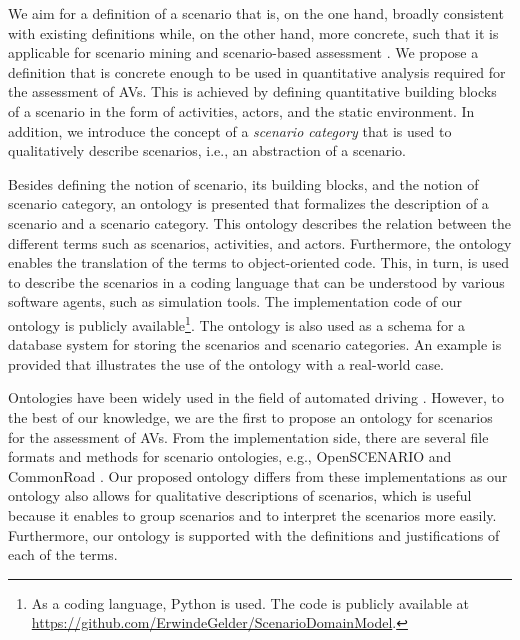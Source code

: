 We aim for a definition of a scenario that is, on the one hand, broadly consistent with existing definitions \autocite{geyer2014, ulbrich2015, elrofai2016scenario} while, on the other hand, more concrete, such that it is applicable for scenario mining \autocite{elrofai2016scenario} and scenario-based assessment \autocite{stellet2015taxonomy, deGelder2017assessment}. We propose a definition that is concrete enough to be used in quantitative analysis required for the assessment of AVs. This is achieved by defining quantitative building blocks of a scenario in the form of activities, actors, and the static environment. In addition, we introduce the concept of a \emph{scenario category}  
that is used to qualitatively describe scenarios, i.e., an abstraction of a scenario. 


Besides defining the notion of scenario, its building blocks, and the notion of scenario category, an ontology is presented that formalizes the description of a scenario and a scenario category. 
This ontology describes the relation between the different terms such as scenarios, activities, and actors.
Furthermore, the ontology enables the translation of the terms to object-oriented code.
This, in turn, is used to describe the scenarios in a coding language that can be understood by various software agents, such as simulation tools. \cstart The implementation code of our ontology is publicly available\footnote{\cstart As a coding language, Python is used. The code is publicly available at \url{https://github.com/ErwindeGelder/ScenarioDomainModel}.\cend}. \cend
The ontology is also used as a schema for a database system for storing the scenarios and scenario categories.
An example is provided that illustrates the use of the ontology with a real-world case.

\cstart Ontologies have been widely used in the field of automated driving \autocite{provine2004ontology, morignot2013ontology, schlenoff2003using, zhao2015core, maiti2017conceptualization, benvenuti2017ontologybased, bagschik2017ontology}. However, to the best of our knowledge, we are the first to propose an ontology for scenarios for the assessment of AVs. 
From the implementation side, there are several file formats and methods for scenario ontologies, e.g., OpenSCENARIO \autocite{openscenario} and CommonRoad \autocite{althoff2017CommonRoad}. Our proposed ontology differs from these implementations as our ontology also allows for qualitative descriptions of scenarios, which is useful because it enables to group scenarios and to interpret the scenarios more easily.
Furthermore, our ontology is supported with the definitions and justifications of each of the terms.\cend


